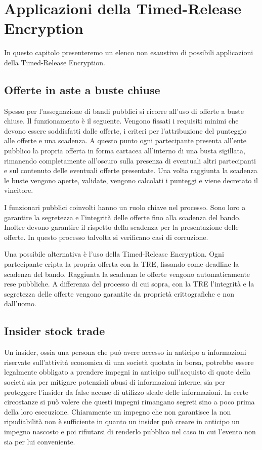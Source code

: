 \chapter{Applicazioni della Timed-Release Encryption}
\label{chap:possibili-usi}

In questo capitolo presenteremo un elenco non esaustivo di possibili
applicazioni della Timed-Release Encryption.

\section{Offerte in aste a buste chiuse}
Spesso per l'assegnazione di bandi pubblici si ricorre all'uso di
offerte a buste chiuse. Il funzionamento è il seguente.
Vengono fissati i requisiti minimi che devono essere soddisfatti
dalle offerte, i criteri per l'attribuzione del punteggio alle offerte e una scadenza.
A questo punto ogni partecipante presenta all'ente pubblico
la propria offerta in forma cartacea
all'interno di una busta sigillata, rimanendo
completamente all'oscuro sulla presenza di eventuali altri partecipanti e sul
contenuto delle eventuali offerte presentate. Una volta raggiunta la scadenza
le buste vengono aperte, validate, vengono calcolati i punteggi
e viene decretato il vincitore.

I funzionari pubblici coinvolti hanno un ruolo chiave nel processo.
Sono loro a garantire la segretezza e l'integrità
delle offerte fino alla scadenza del bando.
Inoltre devono garantire il rispetto della scadenza per la presentazione delle offerte.
In questo processo talvolta si verificano casi di corruzione.

Una possibile alternativa è l'uso della Timed-Release Encryption. Ogni partecipante
cripta la propria offerta con la TRE, fissando come deadline la scadenza del bando.
Raggiunta la scadenza le offerte vengono automaticamente rese pubbliche. A differenza
del processo di cui sopra, con la TRE l'integrità
e la segretezza delle offerte vengono garantite da proprietà crittografiche e non dall'uomo.

\section{Insider stock trade}
Un insider, ossia una persona che può avere accesso in anticipo a informazioni
riservate sull’attività economica di una società quotata in borsa,
potrebbe essere legalmente obbligato a
prendere impegni in anticipo sull'acquisto di quote della società
sia per mitigare potenziali
abusi di informazioni interne, sia per proteggere l'insider da false
accuse di utilizzo sleale delle informazioni.
In certe circostanze
si può volere che questi impegni rimangano segreti sino a poco prima
della loro esecuzione. Chiaramente un impegno che non garantisce la non ripudiabilità
non è sufficiente in quanto un insider può creare in anticipo un impegno nascosto
e poi rifiutarsi di renderlo pubblico nel caso in cui l'evento non sia per lui conveniente.

